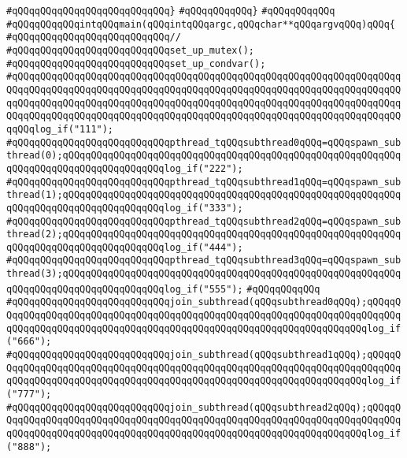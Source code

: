 \verb|#qQQqqQQqqQQqqQQqqQQqqQQqqQQq}|\newline
\verb|#qQQqqQQqqQQq}|\newline
\verb|#qQQqqQQqqQQq|\newline
\verb|#qQQqqQQqqQQqintqQQqmain(qQQqintqQQqargc,qQQqchar**qQQqargvqQQq)qQQq{|\newline
\verb|#qQQqqQQqqQQqqQQqqQQqqQQqqQQq//|\newline
\verb|#qQQqqQQqqQQqqQQqqQQqqQQqqQQqset_up_mutex();|\newline
\verb|#qQQqqQQqqQQqqQQqqQQqqQQqqQQqset_up_condvar();|\newline
\verb|#qQQqqQQqqQQqqQQqqQQqqQQqqQQqqQQqqQQqqQQqqQQqqQQqqQQqqQQqqQQqqQQqqQQqqQQqqQQqqQQqqQQqqQQqqQQqqQQqqQQqqQQqqQQqqQQqqQQqqQQqqQQqqQQqqQQqqQQqqQQqqQQqqQQqqQQqqQQqqQQqqQQqqQQqqQQqqQQqqQQqqQQqqQQqqQQqqQQqqQQqqQQqqQQqqQQqqQQqqQQqqQQqqQQqqQQqqQQqqQQqqQQqqQQqqQQqqQQqqQQqqQQqqQQqqQQqqQQqqQQqqQQqlog_if("111");|\newline
\verb|#qQQqqQQqqQQqqQQqqQQqqQQqqQQqpthread_tqQQqsubthread0qQQq=qQQqspawn_subthread(0);qQQqqQQqqQQqqQQqqQQqqQQqqQQqqQQqqQQqqQQqqQQqqQQqqQQqqQQqqQQqqQQqqQQqqQQqqQQqqQQqqQQqqQQqlog_if("222");|\newline
\verb|#qQQqqQQqqQQqqQQqqQQqqQQqqQQqpthread_tqQQqsubthread1qQQq=qQQqspawn_subthread(1);qQQqqQQqqQQqqQQqqQQqqQQqqQQqqQQqqQQqqQQqqQQqqQQqqQQqqQQqqQQqqQQqqQQqqQQqqQQqqQQqqQQqqQQqlog_if("333");|\newline
\verb|#qQQqqQQqqQQqqQQqqQQqqQQqqQQqpthread_tqQQqsubthread2qQQq=qQQqspawn_subthread(2);qQQqqQQqqQQqqQQqqQQqqQQqqQQqqQQqqQQqqQQqqQQqqQQqqQQqqQQqqQQqqQQqqQQqqQQqqQQqqQQqqQQqqQQqlog_if("444");|\newline
\verb|#qQQqqQQqqQQqqQQqqQQqqQQqqQQqpthread_tqQQqsubthread3qQQq=qQQqspawn_subthread(3);qQQqqQQqqQQqqQQqqQQqqQQqqQQqqQQqqQQqqQQqqQQqqQQqqQQqqQQqqQQqqQQqqQQqqQQqqQQqqQQqqQQqqQQqlog_if("555");|\newline
\verb|#qQQqqQQqqQQq|\newline
\verb|#qQQqqQQqqQQqqQQqqQQqqQQqqQQqjoin_subthread(qQQqsubthread0qQQq);qQQqqQQqqQQqqQQqqQQqqQQqqQQqqQQqqQQqqQQqqQQqqQQqqQQqqQQqqQQqqQQqqQQqqQQqqQQqqQQqqQQqqQQqqQQqqQQqqQQqqQQqqQQqqQQqqQQqqQQqqQQqqQQqqQQqqQQqqQQqlog_if("666");|\newline
\verb|#qQQqqQQqqQQqqQQqqQQqqQQqqQQqjoin_subthread(qQQqsubthread1qQQq);qQQqqQQqqQQqqQQqqQQqqQQqqQQqqQQqqQQqqQQqqQQqqQQqqQQqqQQqqQQqqQQqqQQqqQQqqQQqqQQqqQQqqQQqqQQqqQQqqQQqqQQqqQQqqQQqqQQqqQQqqQQqqQQqqQQqqQQqqQQqlog_if("777");|\newline
\verb|#qQQqqQQqqQQqqQQqqQQqqQQqqQQqjoin_subthread(qQQqsubthread2qQQq);qQQqqQQqqQQqqQQqqQQqqQQqqQQqqQQqqQQqqQQqqQQqqQQqqQQqqQQqqQQqqQQqqQQqqQQqqQQqqQQqqQQqqQQqqQQqqQQqqQQqqQQqqQQqqQQqqQQqqQQqqQQqqQQqqQQqqQQqqQQqlog_if("888");|\newline

